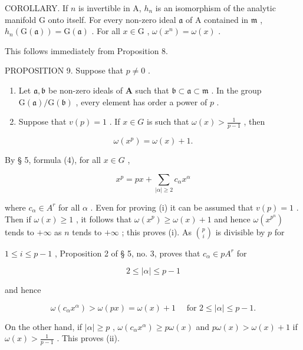 COROLLARY. If \(n\) is invertible in A, \(h_n\) is an isomorphism of the analytic manifold G onto itself. For every non-zero ideal \(\mathfrak{a}\) of A contained in \(\mathfrak{m}\) , \(h_n(\mathrm{G}(\mathfrak{a})) = \mathrm{G}(\mathfrak{a})\) . For all \(x \in \mathrm{G}\) , \(\omega(x^n) = \omega(x)\) .

This follows immediately from Proposition 8.

PROPOSITION 9. Suppose that \(p \neq 0\) .

\begin{enumerate}
\def\labelenumi{(\roman{enumi})}
\item
  Let \(\mathfrak{a},\mathfrak{b}\) be non-zero ideals of \(\mathbf{A}\) such that \(\mathfrak{b} \subset \mathfrak{a} \subset \mathfrak{m}\) . In the group \(\mathrm{G}(\mathfrak{a}) / \mathrm{G}(\mathfrak{b})\) , every element has order a power of \(p\) .
\item
  Suppose that \(v(p) = 1\) . If \(x \in G\) is such that \(\omega(x) > \frac{1}{p - 1}\) , then
\end{enumerate}

\[
\omega (x ^ {p}) = \omega (x) + 1.
\]

By § 5, formula (4), for all \(x \in G\) ,

\[
x ^ {p} = p x + \sum_ {| \alpha | \geqslant 2} c _ {\alpha} x ^ {\alpha}
\]

where \(c_{\alpha} \in A^{r}\) for all \(\alpha\) . Even for proving (i) it can be assumed that \(v(p) = 1\) . Then if \(\omega(x) \geqslant 1\) , it follows that \(\omega(x^{p}) \geqslant \omega(x) + 1\) and hence \(\omega(x^{p^{n}})\) tends to \(+\infty\) as \(n\) tends to \(+\infty\) ; this proves (i). As \(\binom{p}{i}\) is divisible by \(p\) for

\(1 \leqslant i \leqslant p - 1\) , Proposition 2 of § 5, no. 3, proves that \(c_{\alpha} \in pA^{r}\) for

\[
2 \leqslant | \alpha | \leqslant p - 1
\]

and hence

\[
\omega \left(c _ {\alpha} x ^ {\alpha}\right) > \omega (p x) = \omega (x) + 1 \quad \text { for } 2 \leqslant | \alpha | \leqslant p - 1.
\]

On the other hand, if \(|\alpha| \geqslant p\) , \(\omega(c_{\alpha}x^{\alpha}) \geqslant p\omega(x)\) and \(p\omega(x) > \omega(x) + 1\) if \(\omega(x) > \frac{1}{p - 1}\) . This proves (ii).

